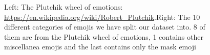 \documentclass[11pt]{article}
\begin{document}
\begin{figure}[ht]
    \centering
    \label{adsad}
    \caption{Left: The Plutchik wheel of emotions: \url{https://en.wikipedia.org/wiki/Robert_Plutchik}.Right: The 10 different categories of emojis we have split our dataset into. 8 of them are from the Plutchik wheel of emotions, 1 contains other miscellanea emojis and the last contains only the mask emoji}%
    \label{fig:example}%
\end{figure}
\end{document}
